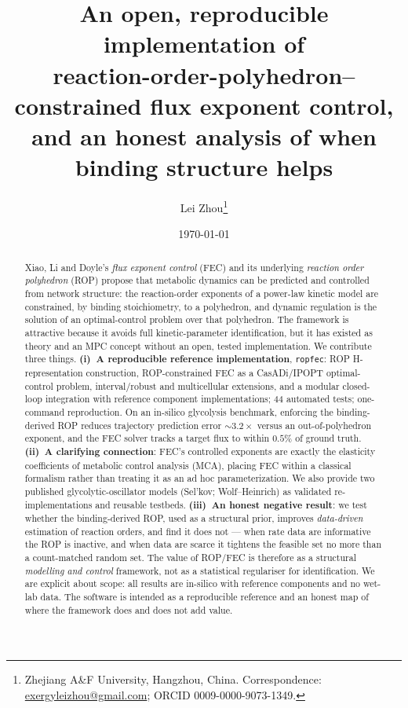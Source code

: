 \documentclass[11pt]{article}
\title{\textbf{An open, reproducible implementation of\\
reaction-order-polyhedron--constrained flux exponent control,\\
and an honest analysis of when binding structure helps}}
\author{Lei Zhou\thanks{Zhejiang A\&F University, Hang\-zhou, China.
Correspondence: \href{mailto:exergyleizhou@gmail.com}{exergyleizhou@gmail.com};
ORCID 0009-0000-9073-1349.}}
\date{\today}
\begin{document}
\maketitle

\begin{abstract}
\noindent
Xiao, Li and Doyle's \emph{flux exponent control} (FEC) and its underlying
\emph{reaction order polyhedron} (ROP) propose that metabolic dynamics can be
predicted and controlled from network structure: the reaction-order exponents of
a power-law kinetic model are constrained, by binding stoichiometry, to a
polyhedron, and dynamic regulation is the solution of an optimal-control problem
over that polyhedron. The framework is attractive because it avoids full
kinetic-parameter identification, but it has existed as theory and an MPC concept
without an open, tested implementation. We contribute three things.
\textbf{(i)~A reproducible reference implementation}, \texttt{ropfec}: ROP
H-representation construction, ROP-constrained FEC as a CasADi/IPOPT
optimal-control problem, interval/robust and multicellular extensions, and a
modular closed-loop integration with reference component implementations; 44
automated tests; one-command reproduction. On an in-silico glycolysis benchmark,
enforcing the binding-derived ROP reduces trajectory prediction error
$\sim\!3.2\times$ versus an out-of-polyhedron exponent, and the FEC solver tracks
a target flux to within $0.5\%$ of ground truth. \textbf{(ii)~A clarifying
connection}: FEC's controlled exponents are exactly the elasticity coefficients
of metabolic control analysis (MCA), placing FEC within a classical formalism
rather than treating it as an ad hoc parameterization. We also provide two
published glycolytic-oscillator models (Sel'kov; Wolf--Heinrich) as validated
re-implementations and reusable testbeds. \textbf{(iii)~An honest negative
result}: we test whether the binding-derived ROP, used as a structural prior,
improves \emph{data-driven} estimation of reaction orders, and find it does not
--- when rate data are informative the ROP is inactive, and when data are scarce
it tightens the feasible set no more than a count-matched random set. The value
of ROP/FEC is therefore as a structural \emph{modelling and control} framework,
not as a statistical regulariser for identification. We are explicit about scope:
all results are in-silico with reference components and no wet-lab data. The
software is intended as a reproducible reference and an honest map of where the
framework does and does not add value.
\end{abstract}
\end{document}
